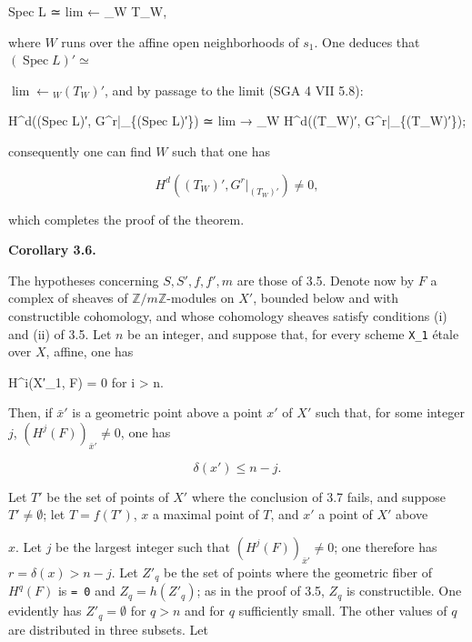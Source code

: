 \documentclass[
]{article}
\newenvironment{Shaded}{}{}
\newcommand{\NormalTok}[1]{#1}
\begin{document}
\begin{Shaded}
\begin{Highlighting}[]
\NormalTok{Spec L ≃ lim ← \_W T\_W,}
\end{Highlighting}
\end{Shaded}

where \(W\) runs over the affine open neighborhoods of \(s_{1}\). One
deduces that \((\operatorname{Spec} L)' \simeq\)

\(\lim \leftarrow {}_{W} (T_{W})'\), and by passage to the limit (SGA 4
VII 5.8):

\begin{Shaded}
\begin{Highlighting}[]
\NormalTok{H\^{}d((Spec L)′, G\^{}r|\_\{(Spec L)′\}) ≃ lim → \_W H\^{}d((T\_W)′, G\^{}r|\_\{(T\_W)′\});}
\end{Highlighting}
\end{Shaded}

consequently one can find \(W\) such that one has

\[
H^{d}((T_{W})', G^{r}|_{(T_{W})'}) \neq 0,
\]

which completes the proof of the theorem.

\textbf{Corollary 3.6.}

The hypotheses concerning \(S, S', f, f', m\) are those of 3.5. Denote
now by \(F\) a complex of sheaves of \(\mathbb{Z}/m\mathbb{Z}\)-modules
on \(X'\), bounded below and with constructible cohomology, and whose
cohomology sheaves satisfy conditions (i) and (ii) of 3.5. Let \(n\) be
an integer, and suppose that, for every scheme \texttt{X\_1} étale over
\(X\), affine, one has

\begin{Shaded}
\begin{Highlighting}[]
\NormalTok{H\^{}i(X′\_1, F) = 0 for i \textgreater{} n.}
\end{Highlighting}
\end{Shaded}

Then, if \(\bar{x}'\) is a geometric point above a point \(x'\) of
\(X'\) such that, for some integer \(j\),
\((H^{j}(F))_{\bar{x}'} \neq 0\), one has

\[
\delta(x') \leqslant n - j.
\]

Let \(T'\) be the set of points of \(X'\) where the conclusion of 3.7
fails, and suppose \(T' \neq \emptyset\); let \(T = f(T')\), \(x\) a
maximal point of \(T\), and \(x'\) a point of \(X'\) above

\(x\). Let \(j\) be the largest integer such that
\((H^{j}(F))_{\bar{x}'} \neq 0\); one therefore has
\(r = \delta(x) > n - j\). Let \(Z'_{q}\) be the set of points where the
geometric fiber of \(H^{q}(F)\) is \texttt{=\ 0} and
\(Z_{q} = h(Z'_{q})\); as in the proof of 3.5, \(Z_{q}\) is
constructible. One evidently has \(Z'_{q} = \emptyset\) for \(q > n\)
and for \(q\) sufficiently small. The other values of \(q\) are
distributed in three subsets. Let
\end{document}
